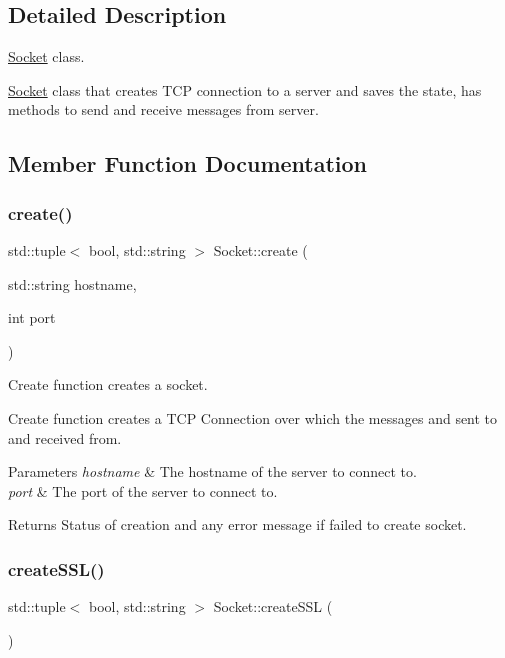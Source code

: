 \subsection{Detailed Description}
\hyperlink{classSocket}{Socket} class. 

\hyperlink{classSocket}{Socket} class that creates T\+CP connection to a server and saves the state, has methods to send and receive messages from server. 

\subsection{Member Function Documentation}
\mbox{\label{classSocket_a5bea2a5422628c243dda71607bc34e7b}} 
\subsubsection{\texorpdfstring{create()}{create()}}
{\footnotesize\ttfamily std\+::tuple$<$ bool, std\+::string $>$ Socket\+::create (\begin{DoxyParamCaption}\item[{std\+::string}]{hostname,  }\item[{int}]{port }\end{DoxyParamCaption})}



Create function creates a socket. 

Create function creates a T\+CP Connection over which the messages and sent to and received from.


\begin{DoxyParams}{Parameters}
{\em hostname} & The hostname of the server to connect to. \\
\hline
{\em port} & The port of the server to connect to.\\
\hline
\end{DoxyParams}
\begin{DoxyReturn}{Returns}
Status of creation and any error message if failed to create socket. 
\end{DoxyReturn}
\mbox{\label{classSocket_a4af3d26d591ec86509d7ea7a700e4c66}} 
\subsubsection{\texorpdfstring{create\+S\+S\+L()}{createSSL()}}
{\footnotesize\ttfamily std\+::tuple$<$ bool, std\+::string $>$ Socket\+::create\+S\+SL (\begin{DoxyParamCaption}{ }\end{DoxyParamCaption})}



